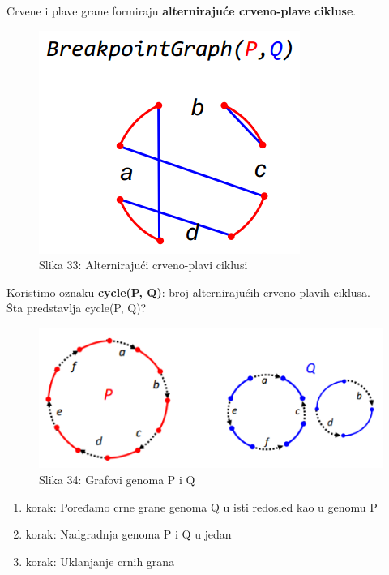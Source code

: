 \documentclass{article}
\begin{document}
{\color{red} Crvene} i {\color{blue} plave} grane formiraju \textbf{alternirajuće crveno-plave cikluse}.
\begin{figure}[h!]
\centering
\includegraphics[scale=0.7]{slike/alternirajuci.PNG}
\caption{Slika 33: Alternirajući crveno-plavi ciklusi }
\label{slika:X}
\end{figure}

\newpage
\noindent Koristimo oznaku \textbf{cycle(P, Q)}: broj alternirajućih crveno-plavih ciklusa.\\

\noindent Šta predstavlja cycle(P, Q)?
\begin{figure}[h!]
\includegraphics[scale=0.7]{slike/PiQ1.PNG}
\caption{Slika 34: Grafovi genoma P i Q}
\label{slika:X}
\end{figure}

\begin{enumerate}
\item {korak: Poređamo crne grane genoma Q u isti redosled kao u genomu P}
\item {korak: Nadgradnja genoma P i Q u jedan}
\item {korak: Uklanjanje crnih grana}
\end{enumerate}
\end{document}

